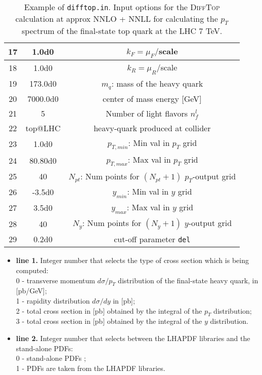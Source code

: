 \documentclass[11pt]{article}
\begin{document}
{\begin{table}[ht]
\begin{centering}
\begin{scriptsize}
\begin{tabular}{|c|c|c|}
	\hline
17  & 	1.0d0     & 	  $k_F=\mu_F/$scale \tabularnewline
	\hline
18  & 	1.0d0     & 	  $k_R=\mu_R/$scale \tabularnewline
	\hline
19  &     173.0d0   &       $m_q$: mass of the heavy quark \tabularnewline
	\hline
20  &     7000.0d0  &       center of mass energy [GeV]\tabularnewline
	\hline
21  &     5         &       Number of light flavors $n^l_{f}$ \tabularnewline
	\hline
22  &     top@LHC   &       heavy-quark produced at collider \tabularnewline
	\hline
23  &     1.0d0     &       $p_{T,min}$: Min val in $p_T$ grid \tabularnewline
	\hline
24  &     80.80d0   &       $p_{T,max}$: Max val in $p_T$ grid \tabularnewline
	\hline
25  &     40        &       $N_{pt}$: Num points for $(N_{pt}+1)$ $p_T$-output grid \tabularnewline 
	\hline
26  &     -3.5d0    &       $y_{min}$: Min val in $y$ grid \tabularnewline
	\hline
27  &     3.5d0     &       $y_{max}$: Max val in $y$ grid \tabularnewline
	\hline
28  &     40        &       $N_y$: Num points for $(N_y+1)$ $y$-output grid \tabularnewline
	\hline
29  &     0.2d0     &       cut-off parameter \texttt{del} \tabularnewline
	\hline 
\end{tabular}
\end{scriptsize}
\par
\end{centering}
\caption{Example of \texttt{difftop.in}. Input options for the \textsc{DiffTop} calculation 
at approx NNLO + NNLL for calculating the $p_T$ spectrum 
of the final-state top quark at the LHC 7 TeV.}
\label{difftop.in}
\end{table}


\begin{itemize}

\item {\bf line 1.} Integer number that selects the type of cross section which is being computed: 
\\
0 - transverse momentum $d\sigma/p_T$ distribution of the final-state heavy quark, in [pb/GeV];
\\
1 - rapidity distribution $d\sigma/dy$ in [pb];   
\\
2 - total cross section in [pb] obtained by the integral of the $p_T$ distribution;
\\
3 - total cross section in [pb] obtained by the integral of the $y$ distribution.

\item {\bf line 2.} Integer number that selects between the LHAPDF libraries and the stand-alone PDFs:
\\
0 - stand-alone PDFs ;
\\ 
1 - PDFs are taken from the LHAPDF libraries. 


\end{itemize}}
\end{document}
